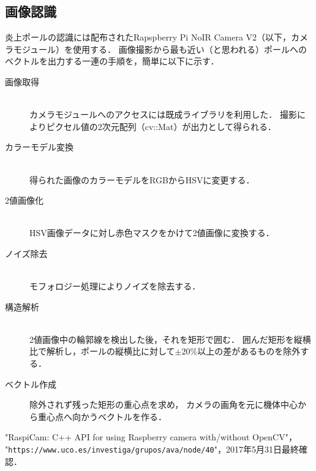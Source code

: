 \documentclass[11pt,a4paper]{jsarticle}
\begin{document}
\subsection{画像認識}
  炎上ポールの認識には配布されたRapspberry Pi NoIR Camera V2（以下，カメラモジュール）を使用する．
  画像撮影から最も近い（と思われる）ポールへのベクトルを出力する一連の手順を，簡単に以下に示す．

  \begin{description}

    \item[画像取得] \mbox{} \\
      カメラモジュールへのアクセスには既成ライブラリ\cite{raspicam}を利用した．
      撮影によりピクセル値の2次元配列（cv::Mat）が出力として得られる．\\

    \item[カラーモデル変換] \mbox{} \\
      得られた画像のカラーモデルをRGBからHSVに変更する．\\

    \item[2値画像化] \mbox{} \\
      HSV画像データに対し赤色マスクをかけて2値画像に変換する．\\

    \item[ノイズ除去] \mbox{} \\
      モフォロジー処理によりノイズを除去する．\\

    \item[構造解析] \mbox{} \\
      2値画像中の輪郭線を検出した後，それを矩形で囲む．
      囲んだ矩形を縦横比で解析し，ポールの縦横比に対して$\pm 20 \%$以上の差があるものを除外する．

    \item[ベクトル作成]
      除外されず残った矩形の重心点を求め，
      カメラの画角を元に機体中心から重心点へ向かうベクトルを作る．\\

  \end{description}

\begin{thebibliography}{9}
   "RaspiCam: C++ API for using Raspberry camera with/without OpenCV"，\\
                     "\texttt{https://www.uco.es/investiga/grupos/ava/node/40}"，2017年5月31日最終確認．
\end{thebibliography}
\end{document}
